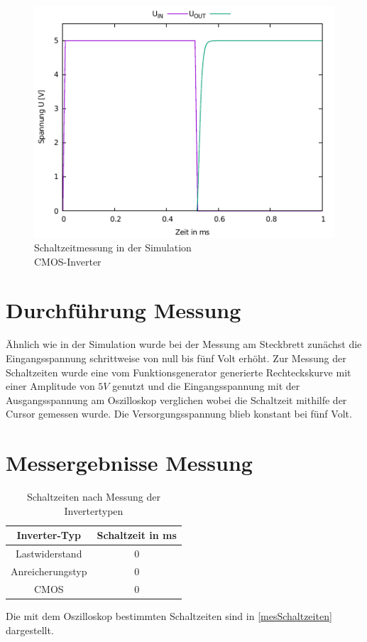 \documentclass[11pt, a4paper]{article}
\begin{document}
\begin{figure}
    \centering
    \includegraphics[width=\linewidth]{simTimeCMOS.pdf}
    \caption{Schaltzeitmessung in der Simulation \\ CMOS-Inverter}
    \label{simTimeCMOS}
\end{figure}
\section*{Durchführung Messung}
Ähnlich wie in der Simulation wurde bei der Messung am Steckbrett zunächst die Eingangsspannung schrittweise von null bis fünf Volt erhöht. 
Zur Messung der Schaltzeiten wurde eine vom Funktionsgenerator generierte Rechteckskurve mit einer Amplitude von $5V$ genutzt und die Eingangsspannung mit der Ausgangsspannung am Oszilloskop verglichen wobei die Schaltzeit mithilfe der Cursor gemessen wurde.
Die Versorgungsspannung blieb konstant bei fünf Volt.
\section*{Messergebnisse Messung}
\begin{table}[h]
\centering
\begin{tabular}{c|c}
Inverter-Typ & Schaltzeit in ms \\ \hline
Lastwiderstand & $0$ \\
Anreicherungstyp & $0$ \\
CMOS & $0$
\end{tabular}
\caption{Schaltzeiten nach Messung der Invertertypen}
\label{mesSchaltzeiten}
\end{table}
Die mit dem Oszilloskop bestimmten Schaltzeiten sind in \autoref{mesSchaltzeiten} dargestellt.
\end{document}
